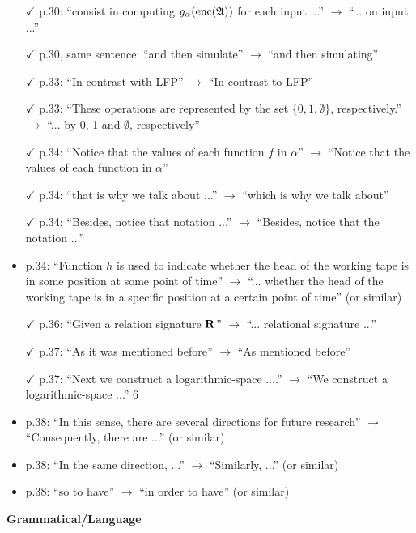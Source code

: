 \begin{itemize}
	\item[$\checkmark$] p.30: ``consist in computing $g_{\alpha}({\rm enc}(\mathfrak{A}))$ for each input ...'' $\to$ ``... on input ...''
	\item[$\checkmark$] p.30, same sentence: ``and then simulate'' $\to$ ``and then simulating''
	\item[$\checkmark$] p.33: ``In contrast with LFP'' $\to$ ``In contrast to LFP''
	\item[$\checkmark$] p.33: ``These operations are represented by the set $\{0,1,\emptyset\}$, respectively.'' $\to$ ``... by 0, 1 and
	$\emptyset$, respectively''
	\item[$\checkmark$] p.34: ``Notice that the values of each function $f$ in $\alpha$'' $\to$ ``Notice that the values of each
	function in $\alpha$''
	\item[$\checkmark$] p.34: ``that is why we talk about ...'' $\to$ ``which is why we talk about''
	\item[$\checkmark$] p.34: ``Besides, notice that notation ...'' $\to$ ``Besides, notice that the notation ...''
	\item p.34: ``Function $h$ is used to indicate whether the head of the working tape is in some position
	at some point of time'' $\to$ ``... whether the head of the working tape is in a specific position
	at a certain point of time'' (or similar)
	\item[$\checkmark$] p.36: ``Given a relation signature $\mathbf{R}$'' $\to$ ``... relational signature ...''
	\item[$\checkmark$] p.37: ``As it was mentioned before'' $\to$ ``As mentioned before''
	\item[$\checkmark$] p.37: ``Next we construct a logarithmic-space ....'' $\to$ ``We construct a logarithmic-space ...''
	6
	\item p.38: ``In this sense, there are several directions for future research'' $\to$ ``Consequently, there
	are ...'' (or similar)
	\item p.38: ``In the same direction, ...'' $\to$ ``Similarly, ...'' (or similar)
	\item p.38: ``so to have'' $\to$ ``in order to have'' (or similar)
\end{itemize}
\vspace{1em}
{\bf Grammatical/Language}
